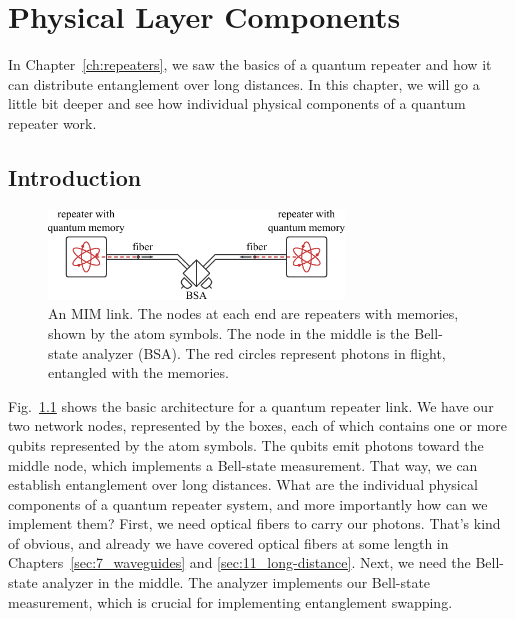 
\chapter{Physical Layer Components}

In Chapter~\ref{ch:repeaters}, we saw the basics of a quantum repeater and how it can distribute entanglement over long distances. In this chapter, we will go a little bit deeper and see how individual physical components of a quantum repeater work.

\section{Introduction}

\begin{figure}[t]
    \centering
    \includegraphics[width=0.7\textwidth]{lesson13/13-1_repeater.pdf}
    \caption[MIM link hardware]{An MIM link. The nodes at each end are repeaters with memories, shown by the atom symbols.  The node in the middle is the Bell-state analyzer (BSA).  The red circles represent photons in flight, entangled with the memories.}
    \label{fig:13-MIM-link}
\end{figure}


Fig.~\ref{fig:13-MIM-link} shows the basic architecture for a quantum repeater link.
We have our two network nodes, represented by the boxes, each of which contains one or more qubits represented by the atom symbols.
The qubits emit photons toward the middle node, which implements a Bell-state measurement.
That way, we can establish entanglement over long distances. What are the individual physical components of a quantum repeater system, and more importantly how can we implement them? First, we need optical fibers to carry our photons. That's kind of obvious, and already we have covered optical fibers at some length in Chapters~\ref{sec:7_waveguides} and \ref{sec:11_long-distance}. Next, we need the Bell-state analyzer in the middle. The analyzer implements our Bell-state measurement, which is crucial for implementing entanglement swapping.


